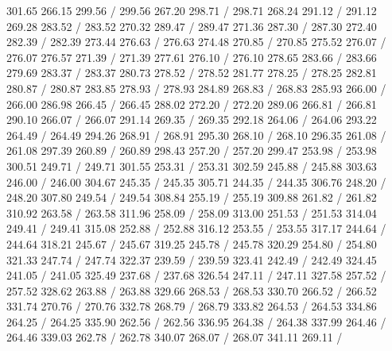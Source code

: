 { 301.65 266.15 299.56 /
 299.56 267.20 298.71 /
 298.71 268.24 291.12 /
 291.12 269.28 283.52 /
 283.52 270.32 289.47 /
 289.47 271.36 287.30 /
 287.30 272.40 282.39 /
 282.39 273.44 276.63 /
 276.63 274.48 270.85 /
 270.85 275.52 276.07 /
 276.07 276.57 271.39 /
 271.39 277.61 276.10 /
 276.10 278.65 283.66 /
 283.66 279.69 283.37 /
 283.37 280.73 278.52 /
 278.52 281.77 278.25 /
 278.25 282.81 280.87 /
 280.87 283.85 278.93 /
 278.93 284.89 268.83 /
 268.83 285.93 266.00 /
 266.00 286.98 266.45 /
 266.45 288.02 272.20 /
 272.20 289.06 266.81 /
 266.81 290.10 266.07 /
 266.07 291.14 269.35 /
 269.35 292.18 264.06 /
 264.06 293.22 264.49 /
 264.49 294.26 268.91 /
 268.91 295.30 268.10 /
 268.10 296.35 261.08 /
 261.08 297.39 260.89 /
 260.89 298.43 257.20 /
 257.20 299.47 253.98 /
 253.98 300.51 249.71 /
 249.71 301.55 253.31 /
 253.31 302.59 245.88 /
 245.88 303.63 246.00 /
 246.00 304.67 245.35 /
 245.35 305.71 244.35 /
 244.35 306.76 248.20 /
 248.20 307.80 249.54 /
 249.54 308.84 255.19 /
 255.19 309.88 261.82 /
 261.82 310.92 263.58 /
 263.58 311.96 258.09 /
 258.09 313.00 251.53 /
 251.53 314.04 249.41 /
 249.41 315.08 252.88 /
 252.88 316.12 253.55 /
 253.55 317.17 244.64 /
 244.64 318.21 245.67 /
 245.67 319.25 245.78 /
 245.78 320.29 254.80 /
 254.80 321.33 247.74 /
 247.74 322.37 239.59 /
 239.59 323.41 242.49 /
 242.49 324.45 241.05 /
 241.05 325.49 237.68 /
 237.68 326.54 247.11 /
 247.11 327.58 257.52 /
 257.52 328.62 263.88 /
 263.88 329.66 268.53 /
 268.53 330.70 266.52 /
 266.52 331.74 270.76 /
 270.76 332.78 268.79 /
 268.79 333.82 264.53 /
 264.53 334.86 264.25 /
 264.25 335.90 262.56 /
 262.56 336.95 264.38 /
 264.38 337.99 264.46 /
 264.46 339.03 262.78 /
 262.78 340.07 268.07 /
 268.07 341.11 269.11 /
}
